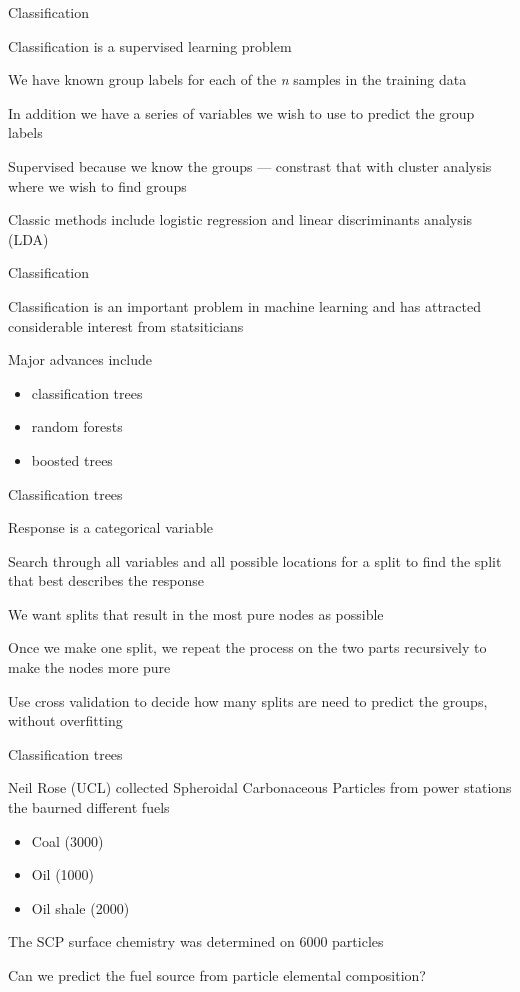 \documentclass[11pt,ignorenonframetext,compress, aspectratio=169]{beamer}
\providecommand{\tightlist}{%
  \setlength{\itemsep}{0pt}\setlength{\parskip}{0pt}}
\begin{document}
\begin{frame}{Classification}

Classification is a supervised learning problem

We have known group labels for each of the \emph{n} samples in the
training data

In addition we have a series of variables we wish to use to predict the
group labels

Supervised because we know the groups --- constrast that with cluster
analysis where we wish to find groups

Classic methods include logistic regression and linear discriminants
analysis (LDA)

\end{frame}

\begin{frame}{Classification}

Classification is an important problem in machine learning and has
attracted considerable interest from statsiticians

Major advances include

\begin{itemize}
\tightlist
\item
  classification trees
\item
  random forests
\item
  boosted trees
\end{itemize}

\end{frame}

\begin{frame}{Classification trees}

Response is a categorical variable

Search through all variables and all possible locations for a split to
find the split that best describes the response

We want splits that result in the most pure nodes as possible

Once we make one split, we repeat the process on the two parts
recursively to make the nodes more pure

Use cross validation to decide how many splits are need to predict the
groups, without overfitting

\end{frame}

\begin{frame}{Classification trees}

Neil Rose (UCL) collected Spheroidal Carbonaceous Particles from power
stations the baurned different fuels

\begin{itemize}
\tightlist
\item
  Coal (3000)
\item
  Oil (1000)
\item
  Oil shale (2000)
\end{itemize}

The SCP surface chemistry was determined on 6000 particles

Can we predict the fuel source from particle elemental composition?

\end{frame}
\end{document}
